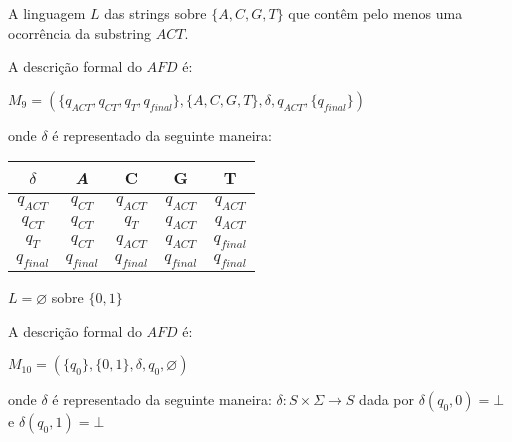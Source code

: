 \documentclass{article}
\begin{document}
\begin{prob}
  A linguagem $L$ das strings sobre $\{A, C, G, T \}$ que contêm pelo menos uma ocorrência da substring $ACT$.

  \begin{center}
  \end{center}

  A descrição formal do $AFD$ é:
  \begin{center}
    $M_9 = (\{q_{ACT},q_{CT},q_{T},q_{final}\}, \{A,C,G,T\},\delta,q_{ACT}, \{q_{final}\})$
  \end{center}
  onde $\delta$ é representado da seguinte maneira:

  \begin{table}[htbp]
    \centering
    \begin{tabular}{c|cccc}
      \textit{$\delta$} & \textit{A}  & C           & G           & T           \\ \hline
      $q_{ACT}$         & $q_{CT}$    & $q_{ACT}$   & $q_{ACT}$   & $q_{ACT}$   \\
      $q_{CT}$          & $q_{CT}$    & $q_{T}$     & $q_{ACT}$   & $q_{ACT}$   \\
      $q_{T}$           & $q_{CT}$    & $q_{ACT}$   & $q_{ACT}$   & $q_{final}$ \\
      $q_{final}$       & $q_{final}$ & $q_{final}$ & $q_{final}$ & $q_{final}$
    \end{tabular}
  \end{table}
\end{prob}

\pagebreak

\begin{prob}
  $L = \varnothing $ sobre $\{0,1\}$

  \begin{center}
  \end{center}

  A descrição formal do $AFD$ é:
  \begin{center}
    $M_{10} = (\{q_{0}\}, \{0,1\},\delta,q_{0}, \varnothing)$
  \end{center}
  onde $\delta$ é representado da seguinte maneira: $\delta:S\times \Sigma\to S$ dada por $\delta(q_0,0)=\bot$ e $\delta(q_0,1)=\bot$
\end{prob}
\end{document}
